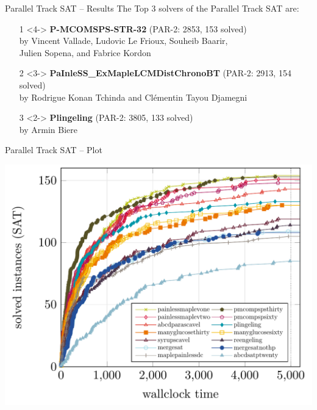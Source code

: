 \documentclass{beamer}
\begin{document}
\begin{frame}{Parallel Track SAT -- Results}
The Top 3 solvers of the Parallel Track SAT are:
\begin{itemize}
\item[1]<4-> {\bf P-MCOMSPS-STR-32} (PAR-2: 2853, 153 solved)\\
by Vincent Vallade, Ludovic Le Frioux, Souheib Baarir,\\Julien Sopena, and Fabrice Kordon
\item[2]<3-> {\bf PaInleSS\_ExMapleLCMDistChronoBT} (PAR-2: 2913, 154 solved)\\
by Rodrigue Konan Tchinda and Cl\'ementin Tayou Djamegni
\item[3]<2-> {\bf Plingeling} (PAR-2: 3805, 133 solved)\\
by Armin Biere
\end{itemize}
\end{frame}


\begin{frame}{Parallel Track SAT -- Plot}

\centering
\includegraphics[width=.8\textwidth]{parallel-SAT}

\end{frame}
\end{document}
